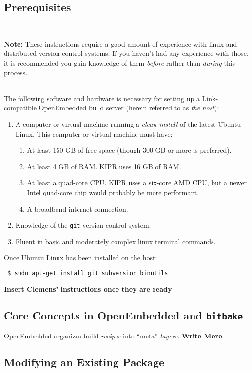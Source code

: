 \documentclass[12pt,letterpaper]{article}
\newcommand{\bcolorbox}[4]{\noindent \\ \fcolorbox{#1}{#2} {\parbox{\textwidth}{\vspace{.1em}\textbf{#3} #4\vspace{.1em}}} \\}
\newcommand{\note}[1]{\bcolorbox{yellow}{Seashell}{Note:}{#1}}
\begin{document}
	\subsection{Prerequisites}
	\note{These instructions require a good amount of experience with linux and distributed version control systems. If you haven't had
	any experience with those, it is recommended you gain knowledge of them \emph{before} rather than \emph{during} this process.}
	
	The following software and hardware is necessary for setting up a Link-compatible OpenEmbedded build server (herein referred to as
	\emph{the host}):
	
	\begin{enumerate}
		\setlength{\itemsep}{0em}
		\item A computer or virtual machine running a \emph{clean install} of the latest Ubuntu Linux. This computer or virtual machine must have:
		\begin{enumerate}
			\setlength{\itemsep}{0em}
			\item At least 150 GB of free space (though 300 GB or more is preferred).
			\item At least 4 GB of RAM. KIPR uses 16 GB of RAM.
			\item At least a quad-core CPU. KIPR uses a six-core AMD CPU, but a newer Intel quad-core
			chip would probably be more performant.
			\item A broadband internet connection.
		\end{enumerate}
		\item Knowledge of the \texttt{git} version control system.
		\item Fluent in basic and moderately complex linux terminal commands.
	\end{enumerate}
	
	Once Ubuntu Linux has been installed on the host:
	
	\texttt{
\$ sudo apt-get install git subversion binutils
	}
	
	\textbf{Insert Clemens' instructions once they are ready}
	
	\subsection{Core Concepts in OpenEmbedded and \texttt{bitbake}}
	OpenEmbedded organizes build \emph{recipes} into ``meta'' \emph{layers}.  \textbf{Write More}.
	
	\subsection{Modifying an Existing Package}
	
\end{document}
